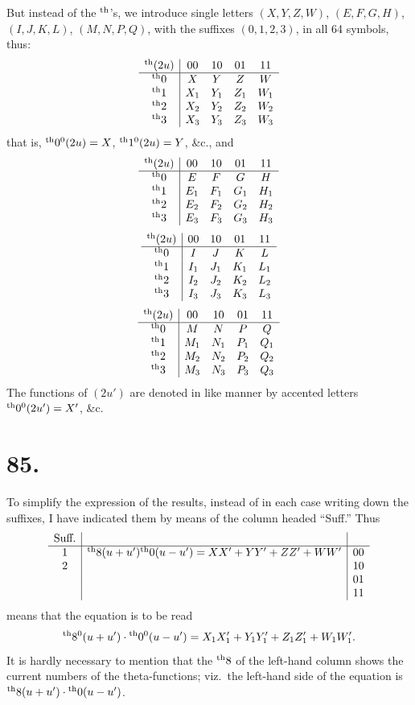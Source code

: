 \documentclass[11pt,a4paper]{book}
\providecommand{\uth}{\textsuperscript{th}}
\begin{document}
But instead of the $\uth{}$'s, we introduce single letters $(X, Y, Z, W)$, $(E, F, G, H)$, $(I, J, K, L)$, $(M, N, P, Q)$, with the suffixes $(0, 1, 2, 3)$, in all 64 symbols, thus:
\[
\begin{array}{c|cccc}
\uth{}(2u) & 00 & 10 & 01 & 11 \\
\hline
\uth{0} & X & Y & Z & W \\
\uth{1} & X_1 & Y_1 & Z_1 & W_1 \\
\uth{2} & X_2 & Y_2 & Z_2 & W_2 \\
\uth{3} & X_3 & Y_3 & Z_3 & W_3
\end{array}
\]
that is, $\uth{0}^0(2u) = X$, $\uth{1}^0(2u) = Y$, \&c., and
\[
\begin{array}{c|cccc}
\uth{}(2u) & 00 & 10 & 01 & 11 \\
\hline
\uth{0} & E & F & G & H \\
\uth{1} & E_1 & F_1 & G_1 & H_1 \\
\uth{2} & E_2 & F_2 & G_2 & H_2 \\
\uth{3} & E_3 & F_3 & G_3 & H_3
\end{array}
\]
\[
\begin{array}{c|cccc}
\uth{}(2u) & 00 & 10 & 01 & 11 \\
\hline
\uth{0} & I & J & K & L \\
\uth{1} & I_1 & J_1 & K_1 & L_1 \\
\uth{2} & I_2 & J_2 & K_2 & L_2 \\
\uth{3} & I_3 & J_3 & K_3 & L_3
\end{array}
\]
\[
\begin{array}{c|cccc}
\uth{}(2u) & 00 & 10 & 01 & 11 \\
\hline
\uth{0} & M & N & P & Q \\
\uth{1} & M_1 & N_1 & P_1 & Q_1 \\
\uth{2} & M_2 & N_2 & P_2 & Q_2 \\
\uth{3} & M_3 & N_3 & P_3 & Q_3
\end{array}
\]
The functions of $(2u')$ are denoted in like manner by accented letters $\uth{0}^0(2u') = X'$, \&c.

\newpage
\section*{85.}
\label{sec:85}

To simplify the expression of the results, instead of in each case writing down the suffixes, I have indicated them by means of the column headed ``Suff.'' Thus
\[
\begin{array}{c|c|c}
\text{Suff.} & & \\
\hline
1 & \uth{8}(u+u')\uth{0}(u-u') = XX' + YY' + ZZ' + WW' & 00 \\
2 & & 10 \\
& & 01 \\
& & 11
\end{array}
\]
means that the equation is to be read
\[
\uth{8}^0(u+u') \cdot \uth{0}^0(u-u') = X_1X_1' + Y_1Y_1' + Z_1Z_1' + W_1W_1'.
\]
It is hardly necessary to mention that the $\uth{8}$ of the left-hand column shows the current numbers of the theta-functions; viz.\ the left-hand side of the equation is $\uth{8}(u+u') \cdot \uth{0}(u-u')$.
\end{document}
